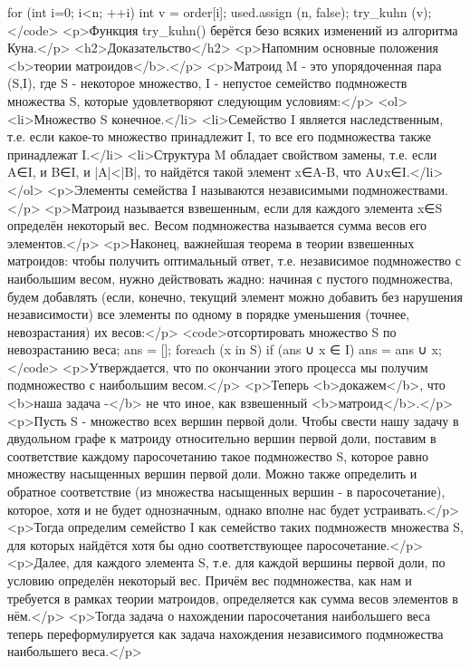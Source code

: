 for (int i=0; i<n; ++i) {
	int v = order[i];
	used.assign (n, false);
	try_kuhn (v);
}</code>
<p>Функция try_kuhn() берётся безо всяких изменений из алгоритма Куна.</p>
<h2>Доказательство</h2>
<p>Напомним основные положения <b>теории матроидов</b>.</p>
<p>Матроид M - это упорядоченная пара (S,I), где S - некоторое множество, I - непустое семейство подмножеств множества S, которые удовлетворяют следующим условиям:</p>
<ol>
<li>Множество S конечное.</li>
<li>Семейство I является наследственным, т.е. если какое-то множество принадлежит I, то все его подмножества также принадлежат I.</li>
<li>Структура M обладает свойством замены, т.е. если A∈I, и B∈I, и |A|<|B|, то найдётся такой элемент x∈A-B, что A∪x∈I.</li>
</ol>
<p>Элементы семейства I называются независимыми подмножествами.</p>
<p>Матроид называется взвешенным, если для каждого элемента x∈S определён некоторый вес. Весом подмножества называется сумма весов его элементов.</p>
<p>Наконец, важнейшая теорема в теории взвешенных матроидов: чтобы получить оптимальный ответ, т.е. независимое подмножество с наибольшим весом, нужно действовать жадно: начиная с пустого подмножества, будем добавлять (если, конечно, текущий элемент можно добавить без нарушения независимости) все элементы по одному в порядке уменьшения (точнее, невозрастания) их весов:</p>
<code>отсортировать множество S по невозрастанию веса;
ans = [];
foreach (x in S)
	if (ans ∪ x ∈ I)
		ans = ans ∪ x;</code>
<p>Утверждается, что по окончании этого процесса мы получим подмножество с наибольшим весом.</p>
<p>Теперь <b>докажем</b>, что <b>наша задача -</b> не что иное, как взвешенный <b>матроид</b>.</p>
<p>Пусть S - множество всех вершин первой доли. Чтобы свести нашу задачу в двудольном графе к матроиду относительно вершин первой доли, поставим в соответствие каждому паросочетанию такое подмножество S, которое равно множеству насыщенных вершин первой доли. Можно также определить и обратное соответствие (из множества насыщенных вершин - в паросочетание), которое, хотя и не будет однозначным, однако вполне нас будет устраивать.</p>
<p>Тогда определим семейство I как семейство таких подмножеств множества S, для которых найдётся хотя бы одно соответствующее паросочетание.</p>
<p>Далее, для каждого элемента S, т.е. для каждой вершины первой доли, по условию определён некоторый вес. Причём вес подмножества, как нам и требуется в рамках теории матроидов, определяется как сумма весов элементов в нём.</p>
<p>Тогда задача о нахождении паросочетания наибольшего веса теперь переформулируется как задача нахождения независимого подмножества наибольшего веса.</p>
